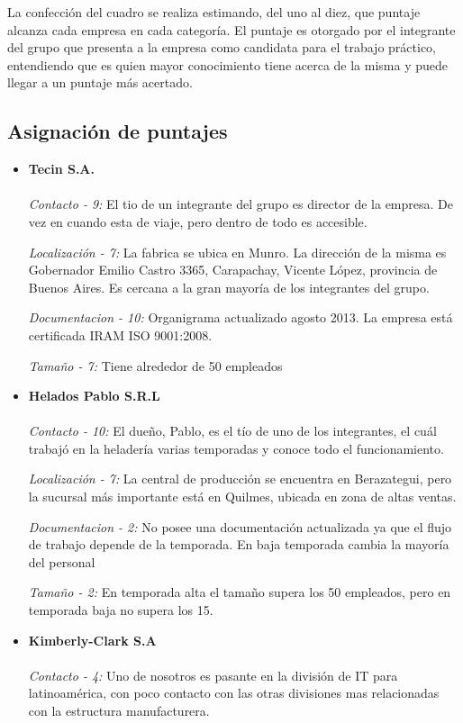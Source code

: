 \documentclass[a4paper,10pt]{article}
\begin{document}
La confección del cuadro se realiza estimando, del uno al diez, que puntaje alcanza cada empresa en cada categoría. El puntaje es otorgado por el integrante del grupo que presenta a la empresa como candidata para el trabajo práctico, entendiendo que es quien mayor conocimiento tiene acerca de la misma y puede llegar a un puntaje más acertado.

\subsection{Asignación de puntajes}

\begin{itemize}

\item \textbf{Tecin S.A.}\\
\\
\textit{Contacto - 9:}
El tio de un integrante del grupo es director de la empresa. De vez en cuando esta de viaje, pero dentro de todo es accesible.

\textit{Localización - 7:}
La fabrica se ubica en Munro. La dirección de la misma es Gobernador Emilio Castro 3365, Carapachay, Vicente López, provincia de Buenos Aires. Es cercana a la gran mayoría de los integrantes del grupo.

\textit{Documentacion - 10:}
Organigrama actualizado agosto 2013. La empresa está certificada IRAM ISO 9001:2008.

\textit{Tamaño - 7:}
Tiene alrededor de 50 empleados

\item \textbf{Helados Pablo S.R.L} \\
\\
\textit{Contacto - 10:}
El dueño, Pablo, es el tío de uno de los integrantes, el cuál trabajó en la heladería varias temporadas y conoce todo el funcionamiento.

\textit{Localización - 7:}
La central de producción se encuentra en Berazategui, pero la sucursal más importante está en Quilmes, ubicada en zona de altas ventas.

\textit{Documentacion - 2:}
No posee una documentación actualizada ya que el flujo de trabajo depende de la temporada. En baja temporada cambia la mayoría del personal

\textit{Tamaño - 2:}
En temporada alta el tamaño supera los 50 empleados, pero en temporada baja no supera los 15.

\item \textbf{Kimberly-Clark S.A} \\
\\
\textit{Contacto - 4:}
Uno de nosotros es pasante en la división de IT para latinoamérica, con poco contacto con las otras divisiones mas relacionadas con la estructura manufacturera.


\end{itemize}
\end{document}
